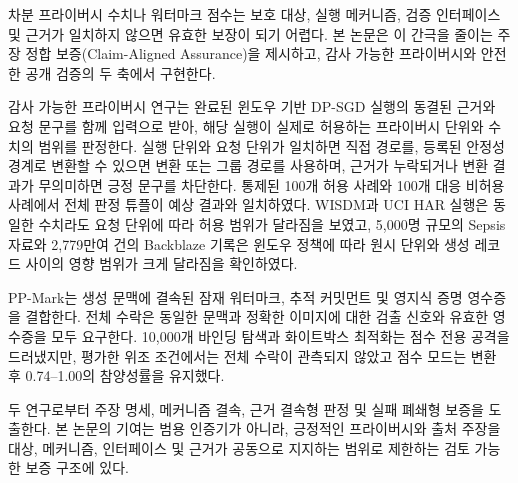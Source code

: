 차분 프라이버시 수치나 워터마크 점수는 보호 대상, 실행 메커니즘, 검증
인터페이스 및 근거가 일치하지 않으면 유효한 보장이 되기 어렵다. 본 논문은 이
간극을 줄이는 주장 정합 보증(Claim-Aligned Assurance)을 제시하고, 감사 가능한
프라이버시와 안전한 공개 검증의 두 축에서 구현한다.

감사 가능한 프라이버시 연구는 완료된 윈도우 기반 DP-SGD 실행의 동결된 근거와
요청 문구를 함께 입력으로 받아, 해당 실행이 실제로 허용하는 프라이버시 단위와
수치의 범위를 판정한다. 실행 단위와 요청 단위가 일치하면 직접 경로를, 등록된
안정성 경계로 변환할 수 있으면 변환 또는 그룹 경로를 사용하며, 근거가 누락되거나
변환 결과가 무의미하면 긍정 문구를 차단한다. 통제된 100개 허용 사례와 100개
대응 비허용 사례에서 전체 판정 튜플이 예상 결과와 일치하였다. WISDM과 UCI HAR
실행은 동일한 수치라도 요청 단위에 따라 허용 범위가 달라짐을 보였고, 5,000명
규모의 Sepsis 자료와 2,779만여 건의 Backblaze 기록은 윈도우 정책에 따라 원시
단위와 생성 레코드 사이의 영향 범위가 크게 달라짐을 확인하였다. 

PP-Mark는 생성 문맥에 결속된 잠재 워터마크, 추적 커밋먼트 및 영지식 증명
영수증을 결합한다. 전체 수락은 동일한 문맥과 정확한 이미지에 대한 검출 신호와
유효한 영수증을 모두 요구한다. 10,000개 바인딩 탐색과 화이트박스 최적화는 점수
전용 공격을 드러냈지만, 평가한 위조 조건에서는 전체 수락이 관측되지 않았고
점수 모드는 변환 후 0.74--1.00의 참양성률을 유지했다.

두 연구로부터 주장 명세, 메커니즘 결속, 근거 결속형 판정 및 실패 폐쇄형 보증을
도출한다. 본 논문의 기여는 범용 인증기가 아니라, 긍정적인 프라이버시와 출처
주장을 대상, 메커니즘, 인터페이스 및 근거가 공동으로 지지하는 범위로 제한하는
검토 가능한 보증 구조에 있다.
